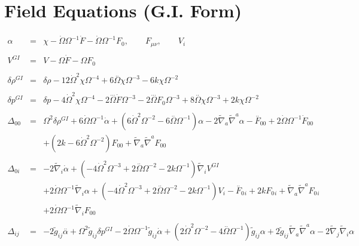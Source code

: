 \documentclass[10pt,letterpaper]{article}
\numberwithin{equation}{section}
\begin{document}
\section{Field Equations (G.I. Form)}
\begin{eqnarray}
\alpha  &=& \chi -   \dot{\Omega} \Omega^{-1}\dot{F} -  \dot{\Omega}\Omega^{-1}F_{0}{}, \qquad F_{\mu\nu},\qquad V_i
\\ \nonumber\\
V^{GI} &=& V-\Omega \dot F -\Omega F_0
\\ \nonumber\\
\delta \rho^{GI}&=&\delta \rho - 12 \dot{\Omega}^2 \chi \Omega^{-4} + 6 \overset{..}{\Omega} \chi \Omega^{-3} - 6 k \chi \Omega^{-2}
\\ \nonumber\\ 
\delta p^{GI}&=&\delta p - 4 \dot{\Omega}^2 \chi \Omega^{-4} - 2 \overset{...}{\Omega} \dot{F} \Omega^{-3} - 2 \overset{...}{\Omega} F_{0}{} \Omega^{-3} + 8 \overset{..}{\Omega} \chi \Omega^{-3} + 2 k \chi \Omega^{-2}
\\ \nonumber\\
\Delta_{00}&=& \Omega^2 \delta \rho^{GI}{} + 6 \dot{\Omega} \Omega^{-1} \dot{\alpha} + (6 \dot{\Omega}^2 \Omega^{-2} - 6 \overset{..}{\Omega} \Omega^{-1}) \alpha - 2 \tilde{\nabla}_{a}\tilde{\nabla}^{a}\alpha - \overset{..}{F}_{00}{} + 2 \dot{\Omega} \Omega^{-1} \dot{F}_{00}{} \nonumber \\ 
&& + (2 k - 6 \dot{\Omega}^2 \Omega^{-2}) F_{00}{} + \tilde{\nabla}_{a}\tilde{\nabla}^{a}F_{00}{}
\\  \nonumber\\ 
\Delta_{0i}&=& -2 \tilde{\nabla}_{i}\dot{\alpha} + (-4 \dot{\Omega}^2 \Omega^{-3} + 2 \overset{..}{\Omega} \Omega^{-2} - 2 k \Omega^{-1}) \tilde{\nabla}_{i}V^{GI}{} \nonumber \\ 
&& + 2 \dot{\Omega} \Omega^{-1} \tilde{\nabla}_{i}\alpha +(-4 \dot{\Omega}^2 \Omega^{-3} + 2 \overset{..}{\Omega} \Omega^{-2} - 2 k \Omega^{-1}) V_{i}- \overset{..}{F}_{0}{}_{i} + 2 k F_{0}{}_{i} + \tilde{\nabla}_{a}\tilde{\nabla}^{a}F_{0}{}_{i} \nonumber \\ 
&& + 2 \dot{\Omega} \Omega^{-1} \tilde{\nabla}_{i}F_{00}{}
\\  \nonumber\\ 
\Delta_{ij}&=& -2 \tilde{g}_{ij} \overset{..}{\alpha} + \Omega^2 \tilde{g}_{ij} \delta p^{GI}{} - 2 \dot{\Omega} \Omega^{-1} \tilde{g}_{ij} \dot{\alpha} + (2 \dot{\Omega}^2 \Omega^{-2} - 4 \overset{..}{\Omega} \Omega^{-1}) \tilde{g}_{ij} \alpha + 2 \tilde{g}_{ij} \tilde{\nabla}_{a}\tilde{\nabla}^{a}\alpha - 2 \tilde{\nabla}_{j}\tilde{\nabla}_{i}\alpha \nonumber \\ 

\end{eqnarray}
\end{document}
